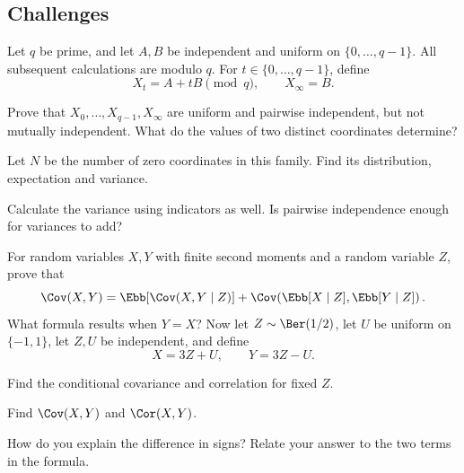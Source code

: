 \subsection*{Challenges}
\begin{problemstar}
Let $q$ be prime, and let $A,B$ be independent and uniform on $\{0,\ldots,q-1\}$.
All subsequent calculations are modulo $q$. For $t\in\{0,\ldots,q-1\}$, define
\[ X_t=A+tB\pmod q,\qquad X_\infty=B. \]
\begin{enumeratea}
  \item Prove that $X_0,\ldots,X_{q-1},X_\infty$ are uniform and pairwise
  independent, but not mutually independent. What do the values of two distinct coordinates determine?
  \item Let $N$ be the number of zero coordinates in this family.
  Find its distribution, expectation and variance.
  \item Calculate the variance using indicators as well. Is pairwise independence
  enough for variances to add?
\end{enumeratea}
\end{problemstar}
\begin{problemstar}
For random variables $X,Y$ with finite second moments and a random variable $Z$, prove that
\[
\Cov(X,Y)=\Ebb\!\left[\Cov(X,Y\mid Z)\right]
+\Cov\!\left(\Ebb[X\mid Z],\Ebb[Y\mid Z]\right).
\]
What formula results when $Y=X$? Now let $Z\sim\Ber(1/2)$, let $U$ be uniform
on $\{-1,1\}$, let $Z,U$ be independent, and define
\[ X=3Z+U,\qquad Y=3Z-U. \]
\begin{enumeratea}
  \item Find the conditional covariance and correlation for fixed $Z$.
  \item Find $\Cov(X,Y)$ and $\Cor(X,Y)$.
  \item How do you explain the difference in signs? Relate your answer to the two terms in the formula.
\end{enumeratea}
\end{problemstar}

